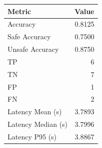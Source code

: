 \begin{table}[ht]
\centering
\begin{tabular}{lr}
\toprule
Metric & Value \\
\midrule
Accuracy & 0.8125 \\
Safe Accuracy & 0.7500 \\
Unsafe Accuracy & 0.8750 \\
TP & 6 \\
TN & 7 \\
FP & 1 \\
FN & 2 \\
Latency Mean (s) & 3.7893 \\
Latency Median (s) & 3.7996 \\
Latency P95 (s) & 3.8867 \\
\bottomrule
\end{tabular}
\end{table}